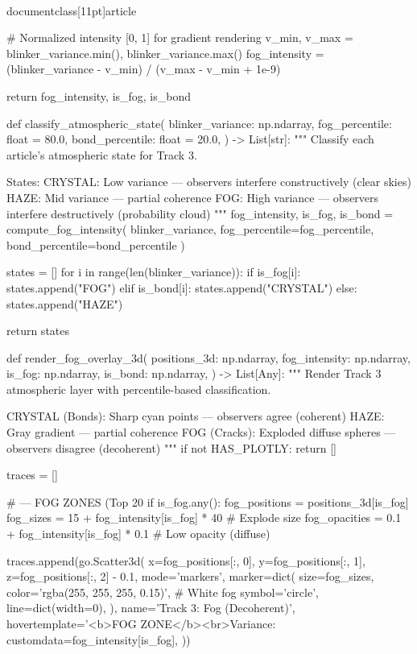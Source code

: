 \\documentclass[11pt]{article}
\begin{document}
\begin{CodeBlock}
{{{    # Normalized intensity [0, 1] for gradient rendering
    v_min, v_max = blinker_variance.min(), blinker_variance.max()
    fog_intensity = (blinker_variance - v_min) / (v_max - v_min + 1e-9)

    return fog_intensity, is_fog, is_bond


def classify_atmospheric_state(
    blinker_variance: np.ndarray,
    fog_percentile: float = 80.0,
    bond_percentile: float = 20.0,
) -> List[str]:
    """
    Classify each article's atmospheric state for Track 3.

    States:
        CRYSTAL: Low variance — observers interfere constructively (clear skies)
        HAZE: Mid variance — partial coherence
        FOG: High variance — observers interfere destructively (probability cloud)
    """
    fog_intensity, is_fog, is_bond = compute_fog_intensity(
        blinker_variance, fog_percentile=fog_percentile, bond_percentile=bond_percentile
    )

    states = []
    for i in range(len(blinker_variance)):
        if is_fog[i]:
            states.append("FOG")
        elif is_bond[i]:
            states.append("CRYSTAL")
        else:
            states.append("HAZE")

    return states


def render_fog_overlay_3d(
    positions_3d: np.ndarray,
    fog_intensity: np.ndarray,
    is_fog: np.ndarray,
    is_bond: np.ndarray,
) -> List[Any]:
    """
    Render Track 3 atmospheric layer with percentile-based classification.

    CRYSTAL (Bonds): Sharp cyan points — observers agree (coherent)
    HAZE: Gray gradient — partial coherence
    FOG (Cracks): Exploded diffuse spheres — observers disagree (decoherent)
    """
    if not HAS_PLOTLY:
        return []

    traces = []

    # --- FOG ZONES (Top 20%
    if is_fog.any():
        fog_positions = positions_3d[is_fog]
        fog_sizes = 15 + fog_intensity[is_fog] * 40  # Explode size
        fog_opacities = 0.1 + fog_intensity[is_fog] * 0.1  # Low opacity (diffuse)

        traces.append(go.Scatter3d(
            x=fog_positions[:, 0],
            y=fog_positions[:, 1],
            z=fog_positions[:, 2] - 0.1,
            mode='markers',
            marker=dict(
                size=fog_sizes,
                color='rgba(255, 255, 255, 0.15)',  # White fog
                symbol='circle',
                line=dict(width=0),
            ),
            name='Track 3: Fog (Decoherent)',
            hovertemplate='<b>FOG ZONE</b><br>Variance: %
            customdata=fog_intensity[is_fog],
        ))

}}}
\end{CodeBlock}
\end{document}
